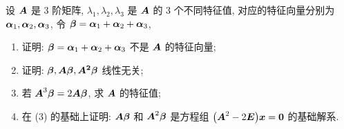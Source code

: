\begin{example}
    设 $\vb*{A}$ 是 3 阶矩阵, $\lambda_1,\lambda_2,\lambda_3$ 是 $\vb*{A}$ 的 3 个不同特征值, 对应的特征向量分别为 $\vb*{\alpha}_1,\vb*{\alpha}_2,\vb*{\alpha}_3$, 令 $\vb*{\beta}=\vb*{\alpha}_1+\vb*{\alpha}_2+\vb*{\alpha}_3$, 
    \begin{enumerate}[label=(\arabic{*})]
        \item 证明: $\vb*{\beta}=\vb*{\alpha}_1+\vb*{\alpha}_2+\vb*{\alpha}_3$ 不是 $\vb*{A}$ 的特征向量;
        \item 证明: $\vb*{\beta},\vb*{A\beta},\vb*{A^2\beta}$ 线性无关;
        \item 若 $\vb*{A}^3\vb*{\beta}=2\vb*{A\beta}$, 求 $\vb*{A}$ 的特征值;
        \item 在 (3) 的基础上证明: $\vb*{A\beta}$ 和 $\vb*{A}^2\vb*{\beta}$ 是方程组 $\qty(\vb*{A}^2-2\vb*{E})\vb*{x}=\vb*{0}$ 的基础解系.
    \end{enumerate}
\end{example}
